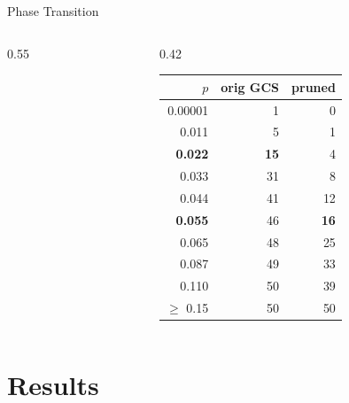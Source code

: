 \begin{frame}[shrink=0.1]{Phase Transition}
\begin{columns}[T]
\begin{column}{0.55\textwidth}
    \end{column}
    \begin{column}{0.42\textwidth}
      \footnotesize
      \centering
      \begin{tabular}{rrr}
        \toprule
        $p$ & \scriptsize orig GCS & \scriptsize pruned\\
        \midrule
        0.00001 & 1 & 0 \\
        0.011 & 5 & 1 \\
        \textbf{0.022} & \textbf{15} & 4 \\
        0.033 & 31 & 8 \\
        0.044 & 41 & 12 \\
        \textbf{0.055} & 46 & \textbf{16} \\
        0.065 & 48 & 25 \\
        0.087 & 49 & 33 \\
        0.110 & 50 & 39 \\
        $\geq$ 0.15 & 50 & 50 \\
        \bottomrule
      \end{tabular}
    \end{column}
  \end{columns}
\end{frame}



\section{Results}\label{sec:7}

